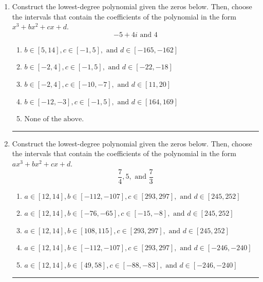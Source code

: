 \documentclass[14pt]{extbook}
\newcommand{\litem}[1]{\item#1\hspace*{-1cm}\rule{\textwidth}{0.4pt}}
\begin{document}
\begin{enumerate}
\litem{
Construct the lowest-degree polynomial given the zeros below. Then, choose the intervals that contain the coefficients of the polynomial in the form $x^3+bx^2+cx+d$.\[ -5 + 4 i \text{ and } 4 \]\begin{enumerate}[label=\Alph*.]
\item \( b \in [5, 14], c \in [-1, 5], \text{ and } d \in [-165, -162] \)
\item \( b \in [-2, 4], c \in [-1, 5], \text{ and } d \in [-22, -18] \)
\item \( b \in [-2, 4], c \in [-10, -7], \text{ and } d \in [11, 20] \)
\item \( b \in [-12, -3], c \in [-1, 5], \text{ and } d \in [164, 169] \)
\item \( \text{None of the above.} \)

\end{enumerate} }
\litem{
Construct the lowest-degree polynomial given the zeros below. Then, choose the intervals that contain the coefficients of the polynomial in the form $ax^3+bx^2+cx+d$.\[ \frac{7}{4}, 5, \text{ and } \frac{7}{3} \]\begin{enumerate}[label=\Alph*.]
\item \( a \in [12, 14], b \in [-112, -107], c \in [293, 297], \text{ and } d \in [245, 252] \)
\item \( a \in [12, 14], b \in [-76, -65], c \in [-15, -8], \text{ and } d \in [245, 252] \)
\item \( a \in [12, 14], b \in [108, 115], c \in [293, 297], \text{ and } d \in [245, 252] \)
\item \( a \in [12, 14], b \in [-112, -107], c \in [293, 297], \text{ and } d \in [-246, -240] \)
\item \( a \in [12, 14], b \in [49, 58], c \in [-88, -83], \text{ and } d \in [-246, -240] \)


\end{enumerate}}
\end{enumerate}
\end{document}

